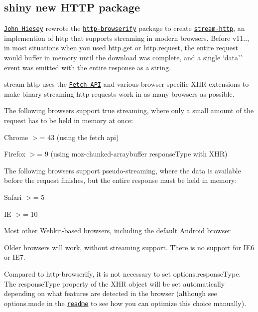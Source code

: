 \subsection*{shiny new H\+T\+TP package}

\href{https://github.com/jhiesey}{\tt John Hiesey} rewrote the \href{https://npmjs.org/package/http-browserify}{\tt http-\/browserify} package to create \href{https://npmjs.org/package/stream-http}{\tt stream-\/http}, an implemention of {\ttfamily http} that supports streaming in modern browsers. Before v11.., in most situations when you used {\ttfamily http.\+get} or {\ttfamily http.\+request}, the entire request would buffer in memory until the download was complete, and a single `\textquotesingle{}data'\`{} event was emitted with the entire response as a string.

{\ttfamily stream-\/http} uses the \href{https://fetch.spec.whatwg.org/}{\tt Fetch A\+PI} and various browser-\/specific X\+HR extensions to make binary streaming http requests work in as many browsers as possible.

The following browsers support true streaming, where only a small amount of the request has to be held in memory at once\+:


\begin{DoxyItemize}
\item Chrome $>$= 43 (using the {\ttfamily fetch} api)
\item Firefox $>$= 9 (using {\ttfamily moz-\/chunked-\/arraybuffer} response\+Type with X\+HR)
\end{DoxyItemize}

The following browsers support pseudo-\/streaming, where the data is available before the request finishes, but the entire response must be held in memory\+:


\begin{DoxyItemize}
\item Safari $>$= 5
\item IE $>$= 10
\item Most other Webkit-\/based browsers, including the default Android browser
\end{DoxyItemize}

Older browsers will work, without streaming support. There is no support for I\+E6 or I\+E7.

Compared to {\ttfamily http-\/browserify}, it is not necessary to set {\ttfamily options.\+response\+Type}. The {\ttfamily response\+Type} property of the X\+HR object will be set automatically depending on what features are detected in the browser (although see {\ttfamily options.\+mode} in the \href{https://github.com/jhiesey/stream-http}{\tt readme} to see how you can optimize this choice manually).

